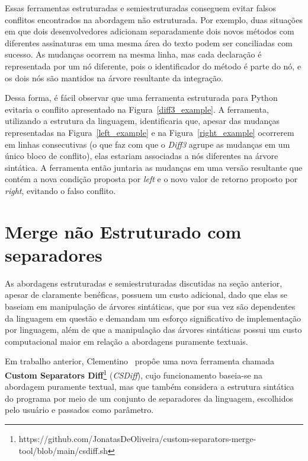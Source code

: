 Essas ferramentas estruturadas e semiestruturadas conseguem evitar falsos
conflitos encontrados na abordagem não estruturada. Por exemplo, duas situações
em que dois desenvolvedores adicionam separadamente dois novos métodos com
diferentes assinaturas em uma mesma área do texto podem ser conciliadas com
sucesso. As mudanças ocorrem na mesma linha, mas cada declaração é representada
por um nó diferente, pois o identificador do método é parte do nó, e os dois
nós são mantidos na árvore resultante da integração.

Dessa forma, é fácil observar que uma ferramenta estruturada para Python
evitaria o conflito apresentado na Figura~\ref{diff3_example}. A ferramenta,
utilizando a estrutura da linguagem, identificaria que, apesar das mudanças
representadas na Figura~\ref{left_example} e na Figura~\ref{right_example}
ocorrerem em linhas consecutivas (o que faz com que o \emph{Diff3} agrupe as
mudanças em um único bloco de conflito), elas estariam associadas a nós
diferentes na árvore sintática. A ferramenta então juntaria as mudanças em uma
versão resultante que contém a nova condição proposta por \emph{left} e o novo
valor de retorno proposto por \emph{right}, evitando o falso conflito.

\section{Merge não Estruturado com separadores}

As abordagens estruturadas e semiestruturadas discutidas na seção anterior,
apesar de claramente benéficas, possuem um custo adicional, dado que elas se
baseiam em manipulação de árvores sintáticas, que por sua vez são dependentes
da linguagem em questão e demandam um esforço significativo de implementação
por linguagem, além de que a manipulação das árvores sintáticas possui um custo
computacional maior em relação a abordagens puramente textuais.

Em trabalho anterior, Clementino~\cite{clem21} propôe uma nova ferramenta
chamada \textbf{Custom Separators
Diff}\footnote{https://github.com/JonatasDeOliveira/custom-separators-merge-tool/blob/main/csdiff.sh}
(\emph{CSDiff}), cujo funcionamento baseia-se na abordagem puramente textual,
mas que também considera a estrutura sintática do programa por meio de um
conjunto de separadores da linguagem, escolhidos pelo usuário e passados como
parâmetro.

